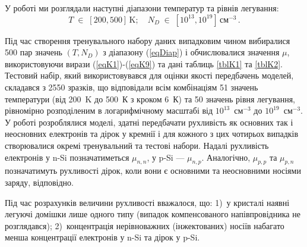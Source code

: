 \documentclass[12pt,a4paper,titlepage,oneside]{book}
\numberwithin{equation}{part}
\begin{document}
У роботі ми розглядали наступні діапазони температур та рівнів легування:
\begin{equation}\label{eqDiap}
  T\;\in\;[200,500]\,\text{K};\quad N_D\;\in\;[10^{13},10^{19}]\,\text{см}^{-3}\,.
\end{equation}

Під час створення тренувального набору даних випадковим чином вибиралися 500 пар значень $(T,N_D)$ з діапазону (\ref{eqDiap}) і
обчислювалися значення $\mu$, використовуючи вирази (\ref{eqK1})-(\ref{eqK9}) та дані таблиць \ref{tblK1} та \ref{tblK2}.
Тестовий набір, який використовувався для оцінки якості передбачень моделей, складався з 2550 зразків, що
відповідали всім комбінаціям 51 значень температури (від 200~K до 500~К з кроком 6~К) та 50 значень рівня легування, рівномірно розподіленим
в логарифмічному масштабі від $10^{13}$~см$^{-3}$ до $10^{19}$~см$^{-3}$.
У роботі розроблялися моделі, здатні передбачати рухливість як основних так і неосновних електронів та дірок у кремнії
і для кожного з цих чотирьох випадків створювалися окремі тренувальний та тестові набори.
Надалі рухливість електронів у n-Si позначатиметься $\mu_{n,n}$, у p-Si --- $\mu_{n,p}$.
Аналогічно, $\mu_{p,p}$ та $\mu_{p,n}$ позначатимуть рухливості дірок, коли вони є основними та неосновними носіями заряду, відповідно.

Під час розрахунків величини рухливості вважалося, що:
1)~у кристалі наявні легуючі домішки лише одного типу (випадок компенсованого напівпровідника не розглядався);
2)~концентрація нерівноважних (інжектованих) носіїв набагато менша концентрації електронів у n-Si та дірок у p-Si.
\end{document}
